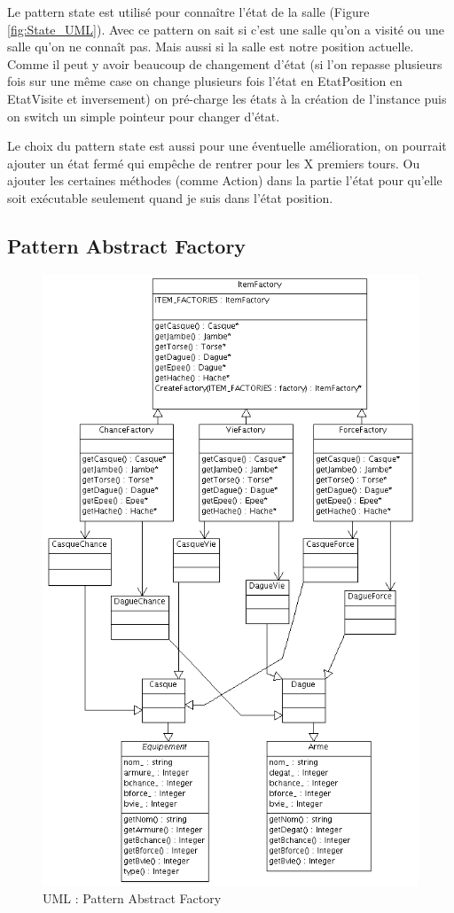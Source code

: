 \documentclass[a4paper]{article}
\begin{document}
Le pattern state est utilisé pour connaître l'état de la salle (Figure \ref{fig:State_UML}\footnotemark[1]).
Avec ce pattern on sait si c'est une salle qu'on a visité ou une salle qu'on ne connaît pas. Mais aussi si la salle est notre position actuelle.
Comme il peut y avoir beaucoup de changement d'état (si l'on repasse plusieurs fois sur une même case on change plusieurs fois l'état en EtatPosition en EtatVisite et inversement) on pré-charge les états à la création de l'instance puis on switch un simple pointeur pour changer d'état.

Le choix du pattern state est aussi pour une éventuelle amélioration, on pourrait ajouter un état fermé qui empêche de rentrer pour les X premiers tours.
Ou ajouter les certaines méthodes (comme Action) dans la partie l'état pour qu'elle soit exécutable seulement quand je suis dans l'état position.

    \subsection{Pattern Abstract Factory}
      \begin{figure}[h]
        \centering
        \includegraphics[width=11.5cm]{./Factory_UML.png}
        \caption{\label{fig:Factory_UML} UML : Pattern Abstract Factory}
      \end{figure}
\end{document}
